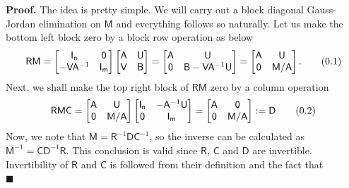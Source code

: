 \documentclass[10pt]{article}
\theoremstyle{definition}
\theoremstyle{definition}
\theoremstyle{remark}
\newenvironment{prf}{\noindent\textbf{Proof.}}{\hfill$\blacksquare$}
\newcommand\eqnum{\addtocounter{equation}{1}\tag{\arabic{section}.\arabic{equation}}}
\begin{document}
\begin{prf}
The idea is pretty simple. We will carry out a block diagonal Gauss-Jordan elimination on $\mathsf{M}$ and everything follows so naturally. Let us make the bottom left block zero by a block row operation as below
\begin{equation*}
\mathsf{R}\mathsf{M} =
\begin{bmatrix}
\mathsf{I_n} & \mathsf{0} \\
-\mathsf{V}\mathsf{A}^{-1} & \mathsf{I_m}
\end{bmatrix}
\begin{bmatrix}
\mathsf{A} & \mathsf{U} \\
\mathsf{V} & \mathsf{B}
\end{bmatrix} =
\begin{bmatrix}
\mathsf{A} & \mathsf{U} \\
\mathsf{0} & \mathsf{B}-\mathsf{V}\mathsf{A}^{-1}\mathsf{U}
\end{bmatrix} =
\begin{bmatrix}
\mathsf{A} & \mathsf{U} \\
\mathsf{0} & \mathsf{M}/\mathsf{A}
\end{bmatrix}.
\eqnum
\label{eq:inv:RM}
\end{equation*}
Next, we shall make the top right block of $\mathsf{R}\mathsf{M}$ zero by a column operation
\begin{equation*}
\mathsf{R}\mathsf{M}\mathsf{C} =
\begin{bmatrix}
\mathsf{A} & \mathsf{U} \\
\mathsf{0} & \mathsf{M}/\mathsf{A}
\end{bmatrix}
\begin{bmatrix}
\mathsf{I_n} & -\mathsf{A}^{-1}\mathsf{U} \\
\mathsf{0} & \mathsf{I_m}
\end{bmatrix} = 
\begin{bmatrix}
\mathsf{A} & \mathsf{0} \\
\mathsf{0} & \mathsf{M}/\mathsf{A}
\end{bmatrix} := \mathsf{D}
\eqnum
\label{eq:D:RMC}
\end{equation*}
Now, we note that $\mathsf{M} = \mathsf{R}^{-1}\mathsf{D}\mathsf{C}^{-1}$, so the inverse can be calculated as $\mathsf{M}^{-1} = \mathsf{C}\mathsf{D}^{-1}\mathsf{R}$. This conclusion is valid since $\mathsf{R}$, $\mathsf{C}$ and $\mathsf{D}$ are invertible. Invertibility of $\mathsf{R}$ and $\mathsf{C}$ is followed from their definition and the fact that 
\begin{equation}

\end{equation}
\end{prf}
\end{document}
